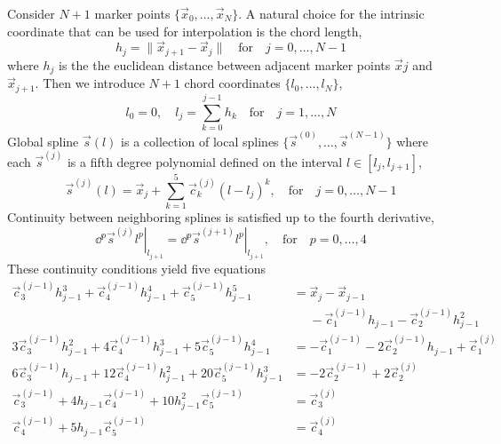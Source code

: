 \documentclass{jfm}
\begin{document}
Consider $N + 1$ marker points $\{\vec{x}_0,\dots,\vec{x}_{N}\}$.
A natural choice for the intrinsic coordinate that can be used for interpolation
is the chord length,
\begin{equation}
h_j=\|\vec{x}_{j+1}-\vec{x}_{j}\|\quad\textrm{for}\quad j=0,\dots,N-1
\end{equation}
where $h_j$ is the the euclidean distance between adjacent marker points $\vec{x}j$ and $\vec{x}_{j+1}$.
Then we  introduce $N+1$ chord coordinates $\{l_0,\dots,l_N\}$,
\begin{equation}
l_0=0,\quad l_j=\sum_{k=0}^{j-1}h_k\quad\textrm{for}\quad j=1,\dots,N
\end{equation}
Global spline $\vec{s}(l)$ is a collection of local splines $\{\vec{s}^{(0)},\dots,\vec{s}^{(N-1)}\}$
where each $\vec{s}^{(j)}$ is a fifth degree polynomial defined on the interval $l\in[l_j,l_{j+1}]$,
\begin{equation}
\vec{s}^{(j)}(l)=\vec{x}_j+\sum_{k=1}^{5}\vec{c}^{(j)}_k(l-l_j)^k,
\quad\textrm{for}\quad j=0,\dots,N-1
\end{equation}
Continuity between neighboring splines is satisfied up to the fourth derivative,
\begin{equation}
\left.\dd{^{p}\vec{s}^{(j)}}{l^p}\right|_{l_{j+1}}=
\left.\dd{^{p}\vec{s}^{(j+1)}}{l^p}\right|_{l_{j+1}},
\quad\textrm{for}\quad p=0,\dots,4
\end{equation}
These continuity conditions yield five equations
\begin{subequations}\label{eq:spline_cont}%
\begin{align}\nonumber
\vec{c}^{(j-1)}_3h_{j-1}^3+\vec{c}^{(j-1)}_4h_{j-1}^4+\vec{c}^{(j-1)}_5h_{j-1}^5
&=\vec{x}_j-\vec{x}_{j-1}\\%
&\phantom{=}-\vec{c}^{(j-1)}_1h_{j-1}-\vec{c}^{(j-1)}_2h_{j-1}^2\\
3\vec{c}^{(j-1)}_3h_{j-1}^2+4\vec{c}^{(j-1)}_4h_{j-1}^3+5\vec{c}^{(j-1)}_5h_{j-1}^4
&=-\vec{c}^{(j-1)}_1-2\vec{c}^{(j-1)}_2h_{j-1}+\vec{c}_1^{(j)}\\
6\vec{c}^{(j-1)}_3h_{j-1}+12\vec{c}^{(j-1)}_4h_{j-1}^2+20\vec{c}^{(j-1)}_5h_{j-1}^3
&=-2\vec{c}^{(j-1)}_2+2\vec{c}_2^{(j)}\\
\vec{c}_3^{(j-1)}+4 h_{j-1} \vec{c}_4^{(j-1)}+10 h_{j-1}^2 \vec{c}_5^{(j-1)}
&=\vec{c}_3^{(j)}\\
\vec{c}_4^{(j-1)}+5 h_{j-1} \vec{c}_5^{(j-1)}
&=\vec{c}_4^{(j)}
\end{align}%
\end{subequations}
\end{document}
